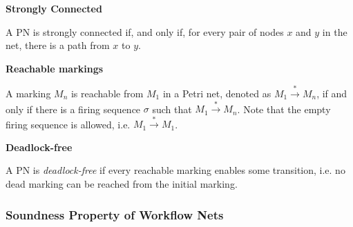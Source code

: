         \begin{definition} \textbf{Strongly Connected} \cite{malinao-rdlt}

        A PN is strongly connected if, and only if, for every pair of nodes $x$ and $y$ in the net, there is a path from $x$ to $y$.
            
        \end{definition}

        \begin{definition} \textbf{Reachable markings} \cite{malinao-rdlt}
        
        A marking $M_{n}$ is reachable from $M_{1}$ in a Petri net, denoted as $M_{1} \overset{*}{\rightarrow} M_{n}$, if and only if there is a firing sequence $\sigma$ such that $M_{1} \overset{*}{\rightarrow} M_{n}$. Note that the empty firing sequence is allowed, i.e. $M_{1} \overset{*}{\rightarrow} M_{1}$.
            
        \end{definition}

        \begin{definition} \textbf{Deadlock-free} \cite{malinao-rdlt}

        A PN is \textit{deadlock-free} if every reachable marking enables some transition, i.e. no dead marking can be reached from the initial marking.
            
        \end{definition}

        \subsubsection*{Soundness Property of Workflow Nets}

